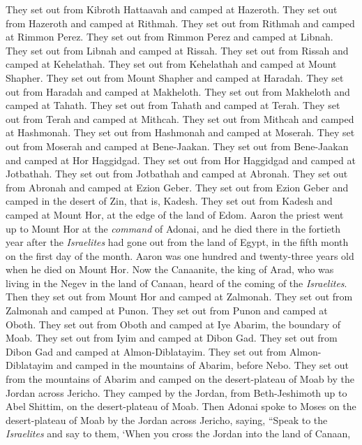 \begin{biblechapter}
\verse They set out from Kibroth Hattaavah and camped at Hazeroth.
\verse They set out from Hazeroth and camped at Rithmah.
\verse They set out from Rithmah and camped at Rimmon Perez.
\verse They set out from Rimmon Perez and camped at Libnah.
\verse They set out from Libnah and camped at Rissah.
\verse They set out from Rissah and camped at Kehelathah.
\verse They set out from Kehelathah and camped at Mount Shapher.
\verse They set out from Mount Shapher and camped at Haradah.
\verse They set out from Haradah and camped at Makheloth.
\verse They set out from Makheloth and camped at Tahath.
\verse They set out from Tahath and camped at Terah.
\verse They set out from Terah and camped at Mithcah.
\verse They set out from Mithcah and camped at Hashmonah.
\verse They set out from Hashmonah and camped at Moserah.
\verse They set out from Moserah and camped at Bene-Jaakan.
\verse They set out from Bene-Jaakan and camped at Hor Haggidgad.
\verse They set out from Hor Haggidgad and camped at Jotbathah.
\verse They set out from Jotbathah and camped at Abronah.
\verse They set out from Abronah and camped at Ezion Geber.
\verse They set out from Ezion Geber and camped in the desert of Zin, that is, Kadesh.
\verse They set out from Kadesh and camped at Mount Hor, at the edge of the land of Edom.
\verse Aaron the priest went up to Mount Hor at the \textit{command} of Adonai, and he died there in the fortieth year after the \textit{Israelites} had gone out from the land of Egypt, in the fifth month on the first day of the month.
\verse Aaron was one hundred and twenty-three years old when he died on Mount Hor.
\verse Now the Canaanite, the king of Arad, who was living in the Negev in the land of Canaan, heard of the coming of the \textit{Israelites}.
\verse Then they set out from Mount Hor and camped at Zalmonah.
\verse They set out from Zalmonah and camped at Punon.
\verse They set out from Punon and camped at Oboth.
\verse They set out from Oboth and camped at Iye Abarim, the boundary of Moab.
\verse They set out from Iyim and camped at Dibon Gad.
\verse They set out from Dibon Gad and camped at Almon-Diblatayim.
\verse They set out from Almon-Diblatayim and camped in the mountains of Abarim, before Nebo.
\verse They set out from the mountains of Abarim and camped on the desert-plateau of Moab by the Jordan across Jericho.
\verse They camped by the Jordan, from Beth-Jeshimoth up to Abel Shittim, on the desert-plateau of Moab.
\verse Then Adonai spoke to Moses on the desert-plateau of Moab by the Jordan across Jericho, saying,
\verse “Speak to the \textit{Israelites} and say to them, ‘When you cross the Jordan into the land of Canaan,

\end{biblechapter}
